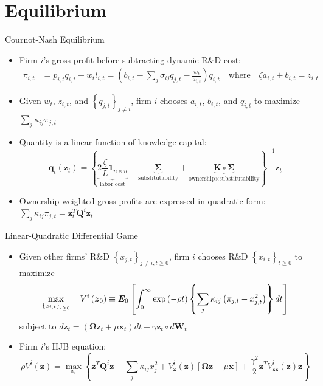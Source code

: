 \documentclass[
  10pt,               %
  aspectratio=169,    %
]{beamer}
\theoremstyle{plain}
\begin{document}
\section{Equilibrium}

\begin{frame}{Cournot-Nash Equilibrium}
  \label{cournot}
  \begin{itemize}
    \item Firm $i$'s gross profit before subtracting dynamic
          R\&D cost: \hyperlink{diagram}{}
          \begin{align*}
            \pi_{i,t} & =p_{i,t}q_{i,t}-w_{t}l_{i,t}=\left(b_{i,t}-\sum_{j}\sigma_{ij}q_{j,t}-\frac{w_{t}}{a_{i,t}}\right)q_{i,t}\quad\text{where}\quad\zeta a_{i,t}+b_{i,t}=z_{i,t}
          \end{align*}
    \item Given $w_{t}$, $z_{i,t}$, and $\left\{ q_{j,t}\right\} _{j\neq i}$,
          firm $i$ chooses $a_{i,t}$, $b_{i,t}$, and $q_{i,t}$ to maximize
          $\sum_{j}\kappa_{ij}\pi_{j,t}$\pause\medskip{}
    \item Quantity is a linear function of knowledge capital:
          \[
            \bm{q}_{t}(\bm{z}_{t})=\left\{ \underbrace{2\frac{\zeta}{L}\bm{1}_{n \times n}}_{\text{labor cost}}+\underbrace{\bm{\Sigma}}_{\text{substitutability}}+\underbrace{\bm{K}\circ\bm{\Sigma}}_{\text{ownership}\times\text{substitutability}}\right\} ^{-1}\bm{z}_{t}
          \]
    \item Ownership-weighted gross profits are expressed in quadratic form:
          $\sum_{j}\kappa_{ij}\pi_{j,t}=\bm{z}_{t}^{T}\bm{Q}^{i}\bm{z}_{t}$
          \hyperlink{Q}{}
  \end{itemize}
\end{frame}
%
\begin{frame}{Linear-Quadratic Differential Game}

  \begin{itemize}
    \item Given other firms' R\&D $\left\{ x_{j,t}\right\} _{j\neq i,t\geq0}$,
          firm $i$ chooses R\&D $\left\{ x_{i,t}\right\} _{t\geq0}$
          to maximize
          \[
            \max_{\left\{ x_{i,t}\right\} _{t\geq0}}\quad V^{i}\left(\text{\ensuremath{\bm{z}}}_{0}\right)\equiv\bm{E}_{0}\left[\int_{0}^{\infty}\exp\left(-\rho t\right)\left\{ \sum_{j}\kappa_{ij}\left(\pi_{j,t}-x_{j,t}^{2}\right)\right\} dt\right]
          \]
          subject to $d\bm{z}_{t}=\left(\bm{\Omega}\bm{z}_{t}+\mu\bm{x}_{t}\right)dt+\gamma\bm{z}_{t} \circ d\bm{W}_{t}$\pause\medskip{}
    \item Firm $i$'s HJB equation:
          \[
            \rho V^{i}\left(\bm{z}\right)=\max_{x_{i}}\left\{ \bm{z}^{T}\bm{Q}^{i}\bm{z}-\sum_{j}\kappa_{ij}x_{j}^{2}+V_{\bm{z}}^{i}\left(\bm{z}\right)\left[\bm{\Omega}\bm{z}+\mu\bm{x}\right]+\frac{\gamma^{2}}{2}\bm{z}^{T}V_{\bm{zz}}^{i}\left(\bm{z}\right)\bm{z}\right\}
          \]
  \end{itemize}
\end{frame}
\end{document}
